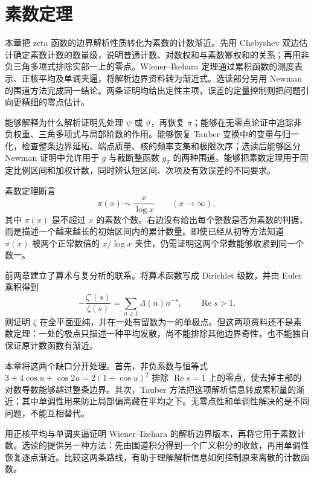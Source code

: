 \chapter{素数定理}
\label{b3:ch:27}

\begin{chapterabstract}
本章把 zeta 函数的边界解析性质转化为素数的计数渐近。先用 Chebyshev 双边估计确定素数计数的数量级，说明普通计数、对数权和与素数幂权和的关系；再用非负三角多项式排除实部一上的零点。Wiener--Ikehara 定理通过累积函数的测度表示、正核平均及单调夹逼，将解析边界资料转为渐近式。选读部分另用 Newman 的围道方法完成同一结论。两条证明均给出定性主项，误差的定量控制则把问题引向更精细的零点估计。
\end{chapterabstract}

\begin{learninggoals}
能够解释为什么解析证明先处理 \(\psi\) 或 \(\vartheta\)，再恢复 \(\pi\)；能够在无零点论证中追踪非负权重、三角多项式与局部阶数的作用。能够恢复 Tauber 变换中的变量与归一化，检查整条边界延拓、端点质量、核的频率支集和极限次序；选读后能够区分 Newman 证明中允许用于 \(g\) 与截断整函数 \(g_T\) 的两种围道。能够把素数定理用于固定比例区间和加权计数，同时辨认短区间、次项及有效误差的不同要求。
\end{learninggoals}

素数定理断言
\[
 \pi(x)\sim\frac{x}{\log x}\qquad(x\to\infty),
\]
其中 \(\pi(x)\) 是不超过 \(x\) 的素数个数。右边没有给出每个整数是否为素数的判据，而是描述一个越来越长的初始区间内的累计数量。即使已经从初等方法知道 \(\pi(x)\) 被两个正常数倍的 \(x/\log x\) 夹住，仍需证明这两个常数能够收紧到同一个数一。

前两章建立了算术与复分析的联系。将算术函数写成 Dirichlet 级数，并由 Euler 乘积得到
\[
 -\frac{\zeta'(s)}{\zeta(s)}
 =\sum_{n\ge1}\Lambda(n)n^{-s},\qquad \operatorname{Re}s>1.
\]
则证明 \(\zeta\) 在全平面亚纯，并在一处有留数为一的单极点。但这两项资料还不是素数定理：一处的极点只描述一种平均发散，尚不能排除其他边界奇性，也不能独自保证原计数函数有渐近。

本章将这两个缺口分开处理。首先，非负系数与恒等式
\(3+4\cos u+\cos2u=2(1+\cos u)^2\)
排除 \(\operatorname{Re}s=1\) 上的零点，使去掉主部的对数导数能够越过整条边界。其次，Tauber 方法把这项解析信息转成累积量的渐近；其中单调性用来防止局部偏离藏在平均之下。无零点性和单调性解决的是不同问题，不能互相替代。

用正核平均与单调夹逼证明 Wiener--Ikehara 的解析边界版本，再将它用于素数计数。选读的提供另一种方法：先由围道积分得到一个广义积分的收敛，再用单调性恢复逐点渐近。比较这两条路线，有助于理解解析信息如何控制原来离散的计数函数。

